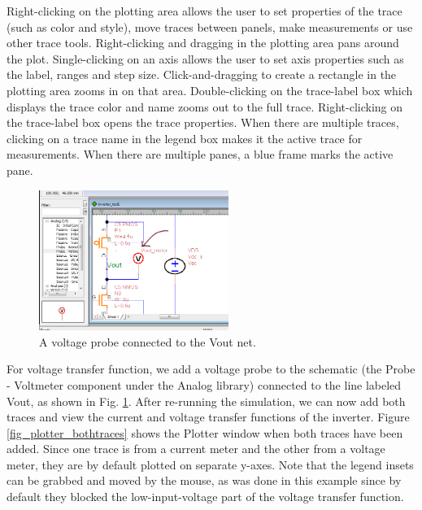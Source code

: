 %
 Right-clicking on the plotting area allows the user to set properties of the trace (such as color and style), move traces between panels, make measurements or use other trace tools.  Right-clicking and dragging in the plotting area pans around the plot.    Single-clicking on an axis allows the user to set axis properties such as the label, ranges and step size.  Click-and-dragging to create a rectangle in the plotting area zooms in on that area.  Double-clicking on the trace-label box which displays the trace color and name zooms out to the full trace.   Right-clicking on the trace-label box opens the trace properties. When there are multiple traces, clicking on a trace name in the legend box makes it the active trace for measurements.  When there are multiple panes, a blue frame marks the active pane.

\begin{figure}
  \includegraphics[width=0.55\textwidth]
	{./figures/getting_started_figures/SchematicEditor_voltageprobeadded.png}
  \caption{A voltage probe connected to the \textsf{Vout} net.}
  \label{fig_addvoltageprobe}
\end{figure}

For voltage transfer function, we add a voltage probe to the schematic (the \textsf{Probe - Voltmeter} component under the Analog library) connected to the line labeled \textsf{Vout}, as shown in Fig. \ref{fig_addvoltageprobe}.  After re-running the simulation, we can now add both traces and view the current and voltage transfer functions of the inverter.  Figure \ref{fig_plotter_bothtraces} shows the Plotter window when both traces have been added.  Since one trace is from a current meter and the other from a voltage meter, they are by default plotted on separate y-axes.  Note that the legend insets can be grabbed and moved by the mouse, as was done in this example since by default they blocked the low-input-voltage part of the voltage transfer function. 

